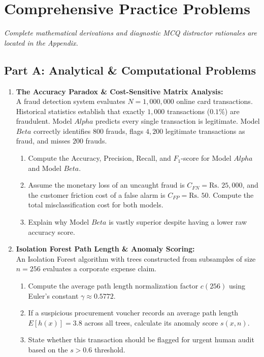\section{Comprehensive Practice Problems}
\textit{Complete mathematical derivations and diagnostic MCQ distractor rationales are located in the Appendix.}

\subsection*{Part A: Analytical \& Computational Problems}

\begin{enumerate}[label=\textbf{P9.\arabic*}]
    \item \textbf{The Accuracy Paradox \& Cost-Sensitive Matrix Analysis:}\\
    A fraud detection system evaluates $N = 1{,}000{,}000$ online card transactions. Historical statistics establish that exactly $1{,}000$ transactions ($0.1\%$) are fraudulent. Model $Alpha$ predicts every single transaction is legitimate. Model $Beta$ correctly identifies $800$ frauds, flags $4{,}200$ legitimate transactions as fraud, and misses $200$ frauds.
    \begin{enumerate}[label=(\alph*)]
        \item Compute the Accuracy, Precision, Recall, and $F_1$-score for Model $Alpha$ and Model $Beta$.
        \item Assume the monetary loss of an uncaught fraud is $C_{FN} = \text{Rs.~} 25{,}000$, and the customer friction cost of a false alarm is $C_{FP} = \text{Rs.~} 50$. Compute the total misclassification cost for both models.
        \item Explain why Model $Beta$ is vastly superior despite having a lower raw accuracy score.
    \end{enumerate}

    \item \textbf{Isolation Forest Path Length \& Anomaly Scoring:}\\
    An Isolation Forest algorithm with trees constructed from subsamples of size $n = 256$ evaluates a corporate expense claim.
    \begin{enumerate}[label=(\alph*)]
        \item Compute the average path length normalization factor $c(256)$ using Euler's constant $\gamma \approx 0.5772$.
        \item If a suspicious procurement voucher records an average path length $E[h(x)] = 3.8$ across all trees, calculate its anomaly score $s(x, n)$.
        \item State whether this transaction should be flagged for urgent human audit based on the $s > 0.6$ threshold.
    \end{enumerate}


\end{enumerate}
